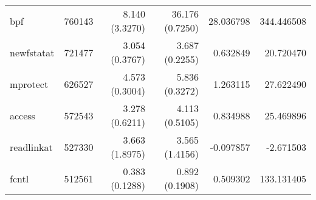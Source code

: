 \begin{tabular}{>{\ttfamily}lrrrrr}
                            bpf &   760143 &           8.140 (3.3270) &          36.176 (0.7250) &       28.036798 &   344.446508 \\
                     newfstatat &   721477 &           3.054 (0.3767) &           3.687 (0.2255) &        0.632849 &    20.720470 \\
                       mprotect &   626527 &           4.573 (0.3004) &           5.836 (0.3272) &        1.263115 &    27.622490 \\
                         access &   572543 &           3.278 (0.6211) &           4.113 (0.5105) &        0.834988 &    25.469896 \\
                     readlinkat &   527330 &           3.663 (1.8975) &           3.565 (1.4156) &       -0.097857 &    -2.671503 \\
                          fcntl &   512561 &           0.383 (0.1288) &           0.892 (0.1908) &        0.509302 &   133.131405 \\
\bottomrule
\end{tabular}
